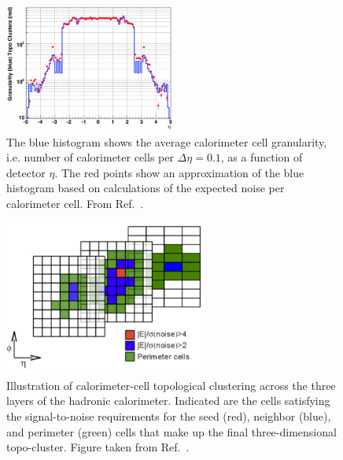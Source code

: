 \begin{figure}[!htb]
    \begin{center}
        \includegraphics[width=0.5\textwidth]{figures/chapter3/jets/calocell_granularity}
        \caption{
            The blue histogram shows the average calorimeter cell granularity, i.e. number of calorimeter cells per
            $\Delta \eta = 0.1$, as a function of detector $\eta$. The red points show an approximation of the blue
            histogram based on calculations of the expected noise per calorimeter cell.
            From Ref.~\cite{Lampl:2008zz}.
        }
        \label{fig:calocell_granularity}
    \end{center}
\end{figure}

\begin{figure}[!htb]
    \begin{center}
    \includegraphics[width=0.6\textwidth]{figures/chapter3/jets/calocell_clustering_cartoon}
    \caption{
        Illustration of calorimeter-cell topological clustering across the three layers of the
        hadronic calorimeter. Indicated are the cells satisfying the signal-to-noise requirements for
        the seed (red), neighbor (blue), and perimeter (green) cells that make up the final three-dimensional topo-cluster.
        Figure taken from Ref.~\cite{MontejoBerlingen:2053769}.
    }
    \label{fig:calocell_clustering}
    \end{center}
\end{figure}
\FloatBarrier

